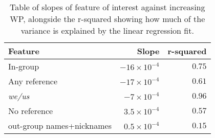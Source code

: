 \begin{table}[t]
    \centering
    \begin{tabular}{lrr}
        \toprule
        \textbf{Feature} & \textbf{Slope} & \textbf{r-squared} \\ \midrule
        In-group & $-16\times 10^{-4}$ & $0.75$ \\ 
        Any reference & $-17\times 10^{-4}$ & $0.61$ \\ 
        \emph{we/us} & $-7\times 10^{-4}$ & $0.96$ \\ 
        No reference & $3.5\times 10^{-4}$ & $0.57$ \\ 
        out-group names+nicknames & $0.5\times 10^{-4}$ & $0.15$ \\\bottomrule
    \end{tabular}
    \caption{Table of slopes of feature of interest against increasing WP, alongside the r-squared showing how much of the variance is explained by the linear regression fit.}
    \label{tab:slopes}
\end{table}
